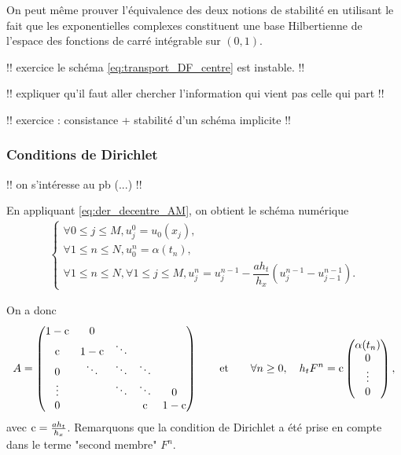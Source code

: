 \documentclass[12pt,a4paper,twoside]{article}
\begin{document}
\begin{remark}
  On peut m\^eme prouver l'\'equivalence des deux notions de stabilit\'e
  en utilisant le fait que les exponentielles complexes constituent une base
  Hilbertienne de l'espace des fonctions de carr\'e int\'egrable sur $(0,1)$.
\end{remark}



!! exercice le sch\'ema \eqref{eq:transport_DF_centre} est instable. !!

!! expliquer qu'il faut aller chercher l'information qui vient
pas celle qui part !!


!! exercice : consistance + stabilit\'e d'un sch\'ema implicite !!

\subsubsection{Conditions de Dirichlet}

!! on s'int\'eresse au pb (...) !!

En appliquant \eqref{eq:der_decentre_AM}, 
on obtient le sch\'ema num\'erique
\begin{align}
  \label{eq:transport_DF_decentre_AM_dir}
  \left\{
  \begin{array}{l}
    \forall 0 \leq j \leq M , 
    u_j^0 = u_0(x_j) ,
    \\
    \forall 1 \leq n \leq N, u_0^n = \alpha(t_n) ,
    \\
    \forall 1 \leq n \leq N, \forall 1 \leq j \leq M,
    u_j^n = u_j^{n-1} - \dfrac{a h_t}{h_x} (u_{j}^{n-1} - u_{j-1}^{n-1}) .
  \end{array}
  \right.
\end{align}

On a donc 
\begin{align}
  A =
  \begin{pmatrix}
    1 - \mathrm{c} & 0 & & &
    \\
    \mathrm{c} & 1 - \mathrm{c} & \ddots & &
    \\
    0 & \ddots & \ddots & \ddots &
    \\
    \vdots & & \ddots & \ddots & 0
    \\
    0 & & & \mathrm{c} & 1-\mathrm{c}
  \end{pmatrix}
  \qquad \text{et} \qquad
  \forall n \geq 0,
  \quad h_t F^n = \mathrm{c}
  \begin{pmatrix}
    \alpha(t_n)
    \\
    0
    \\
    \vdots
    \\
    0
  \end{pmatrix}
  ,
\end{align}
avec $\mathrm{c} = \frac{a h_t}{h_x}$.
Remarquons que la condition de Dirichlet a \'et\'e prise en compte
dans le terme "second membre" $F^n$.
\end{document}
